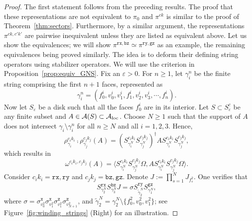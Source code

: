 \documentclass[a4paper,11pt]{article}
\theoremstyle{definition}
\theoremstyle{remark}
\theoremstyle{remark}
\begin{document}
\begin{proof}
    The first statement follows from the preceding results.
    The proof that these representations are not equivalent to $\pi_0$ and $\pi^{ck}$ is similar to the proof of Theorem~\ref{thm:sectors}. 
    Furthermore, by a similar argument, the representations $\pi^{ck,c'k'}$ are pairwise inequivalent unless they are listed as equivalent above.
    Let us show the equivalences; we will show $\pi^{\mathtt{rx},\mathtt{bz}} \simeq \pi^{\mathtt{ry},\mathtt{gz}}$ as an example, the remaining equivalences being proved similarly.
    The idea is to deform their defining string operators using stabilizer operators. 
    We will use the criterion in Proposition~\ref{prop:equiv_GNS}. Fix an $\varepsilon>0$. 
    For $n\geq 1$, let $\gamma_i^n$ be the finite string comprising the first $n+1$ faces, represented as
    \begin{equation*}
        \gamma_i^n = (f_0^i,v_0^i, v_1^i,f_1^i, v_2^i, v_3^i, \cdots, f_n^i).
    \end{equation*}
    Now let $S_\varepsilon$ be a disk such that all the faces $f_0^i$ are in its interior.  
    Let $S\subset S_{\varepsilon}^c$ be any finite subset and $A\in \mathcal{A}(S) \subset \mathcal{A}_{\rm loc}$. 
    Choose $N\geq 1$ such that the support of $A$ does not intersect $\gamma_i\setminus\gamma_i^n$ for all $n\geq N$ and all $i=1,2,3$.
    Hence, 
    \begin{equation*}
        \rho_{\gamma_i}^{c_ik_i}\comp \rho_{\gamma_j}^{c_jk_j}(A) = (S_{\gamma_i^N}^{c_ik_i}S_{\gamma_j^N}^{c_jk_j})^\dagger AS_{\gamma_i^N}^{c_ik_i}S_{\gamma_j^N}^{c_jk_j},
    \end{equation*}
    which results in 
    \begin{equation*}
        \omega^{c_ik_i,c_jk_j}(A) = \langle S_{\gamma_i^N}^{c_ik_i}S_{\gamma_j^N}^{c_jk_j} \Omega, AS_{\gamma_i^N}^{c_ik_i}S_{\gamma_j^N}^{c_jk_j}\Omega \rangle. 
    \end{equation*}
    Consider $c_ik_i=\mathtt{rx}, \mathtt{ry}$ and $c_jk_j=\mathtt{bz}, \mathtt{gz}$. 
    Denote $J:=\prod_{s=1}^NJ_{f_s^2}$. 
    One verifies that 
    \begin{equation*}
        S_{\gamma_2^N}^{\mathtt{rx}}S_{\gamma_3^N}^{\mathtt{bz}} J = \sigma  S^{\mathtt{ry}}_{\tilde{\gamma}_2^N}S^{\mathtt{gz}}_{\gamma_1^N},
    \end{equation*}
    where $\sigma = \sigma_{v_0^2}^{\mathtt{x}}\sigma_{v_1^2}^{\mathtt{x}}\sigma_{v_1^2}^{\mathtt{z}}\sigma_{v_{N+1}^2}^{\mathtt{z}}$, and $\tilde{\gamma}_2^N = \gamma_2^N\setminus\{f_0^2,v_0^2,v_1^2\}$; see Figure~\ref{fig:winding_strings} (Right) for an illustration. 

\end{proof}
\end{document}
